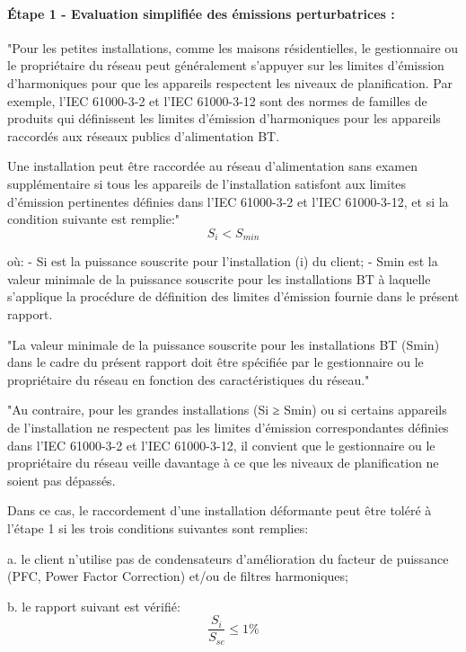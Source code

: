 \paragraph{Étape 1 - Evaluation simplifiée des émissions perturbatrices :}

"Pour les petites installations, comme les maisons résidentielles, le gestionnaire ou le propriétaire du réseau peut généralement s'appuyer sur les limites d'émission d'harmoniques pour que les appareils respectent les niveaux de planification. Par exemple, l'IEC 61000-3-2 et l'IEC 61000-3-12 sont des normes de familles de produits qui définissent les limites d'émission d'harmoniques pour les appareils raccordés aux réseaux publics d'alimentation BT.

Une installation peut être raccordée au réseau d'alimentation sans examen supplémentaire si tous les appareils de l'installation satisfont aux limites d'émission pertinentes définies dans l'IEC 61000-3-2 et l'IEC 61000-3-12, et si la condition suivante est remplie:"
\begin{equation}
    S_i < S_{min}
\end{equation}

où:
- Si est la puissance souscrite pour l'installation (i) du client;
- Smin est la valeur minimale de la puissance souscrite pour les installations BT à laquelle s'applique la procédure de définition des limites d'émission fournie dans le présent rapport.

"La valeur minimale de la puissance souscrite pour les installations BT (Smin) dans le cadre du présent rapport doit être spécifiée par le gestionnaire ou le propriétaire du réseau en fonction des caractéristiques du réseau."

"Au contraire, pour les grandes installations (Si ≥ Smin) ou si certains appareils de l'installation ne respectent pas les limites d'émission correspondantes définies dans l'IEC 61000-3-2 et l'IEC 61000-3-12, il convient que le gestionnaire ou le propriétaire du réseau veille davantage à ce que les niveaux de planification ne soient pas dépassés.

Dans ce cas, le raccordement d'une installation déformante peut être toléré à l'étape 1 si les trois conditions suivantes sont remplies:

a. le client n'utilise pas de condensateurs d'amélioration du facteur de puissance (PFC, Power Factor Correction) et/ou de filtres harmoniques;

b. le rapport suivant est vérifié:
\begin{equation}
    \frac{S_i}{S_{sc}} \leqslant 1\%
\end{equation}

